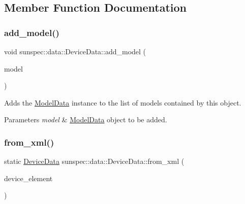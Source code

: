 \subsection{Member Function Documentation}
\mbox{\label{structsunspec_1_1data_1_1_device_data_a207df2dfcfc041cf9e93e2b917888030}} 
\subsubsection{\texorpdfstring{add\+\_\+model()}{add\_model()}}
{\footnotesize\ttfamily void sunspec\+::data\+::\+Device\+Data\+::add\+\_\+model (\begin{DoxyParamCaption}\item[{const \hyperlink{structsunspec_1_1data_1_1_model_data}{Model\+Data} \&}]{model }\end{DoxyParamCaption})}

Adds the {\ttfamily \hyperlink{structsunspec_1_1data_1_1_model_data}{Model\+Data}} instance to the list of models contained by this object. 
\begin{DoxyParams}{Parameters}
{\em model} & {\ttfamily \hyperlink{structsunspec_1_1data_1_1_model_data}{Model\+Data}} object to be added. \\
\hline
\end{DoxyParams}
\mbox{\label{structsunspec_1_1data_1_1_device_data_a8b7e40e1d57748cf963a1a41dbc092d2}} 
\subsubsection{\texorpdfstring{from\+\_\+xml()}{from\_xml()}\hspace{0.1cm}{\footnotesize\ttfamily [1/2]}}
{\footnotesize\ttfamily static \hyperlink{structsunspec_1_1data_1_1_device_data}{Device\+Data} sunspec\+::data\+::\+Device\+Data\+::from\+\_\+xml (\begin{DoxyParamCaption}\item[{const boost\+::property\+\_\+tree\+::ptree \&}]{device\+\_\+element }\end{DoxyParamCaption})\hspace{0.3cm}{\ttfamily [static]}}

